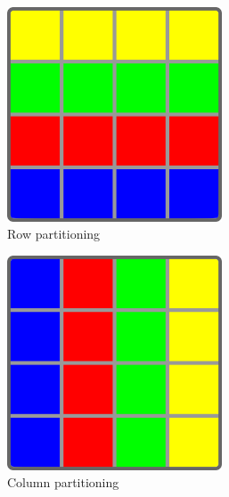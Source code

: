 \begin{figure}
	\centering
	\begin{subfigure}{.3\linewidth}
		\centering
		\includegraphics[width=0.7\textwidth]{images/rowPartitioning.png}
		\caption{Row partitioning}
		\label{fig:rowPartitioning}
	\end{subfigure}
	\begin{subfigure}{.3\linewidth}
		\centering
		\includegraphics[width=0.7\textwidth]{images/columnPartitioning.png}
		\caption{Column partitioning}
		\label{fig:columnPartitioning}
	\end{subfigure}
	\begin{subfigure}{.3\linewidth}
		\centering

\end{subfigure}
\end{figure}
